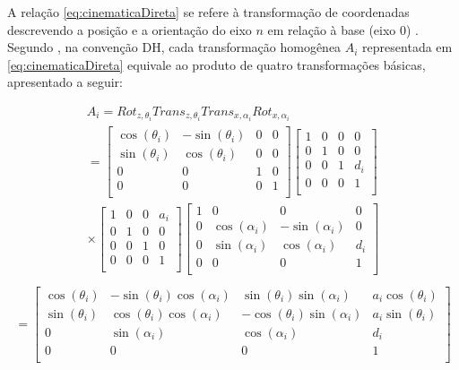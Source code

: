 A relação \eqref{eq:cinematicaDireta} se refere à transformação de coordenadas descrevendo 
a posição e a orientação do eixo $n$ em relação à base (eixo $0$) \cite{siciliano}. Segundo
, na convenção DH, cada transformação homogênea $A_i$ representada em
\eqref{eq:cinematicaDireta} equivale ao produto de quatro transformações básicas, apresentado a seguir:

\begin{equation*}
  \begin{gathered}
    A_i = Rot_{z,\theta_i}Trans_{z,\theta_i}Trans_{x,\alpha_i}Rot_{x,\alpha_i} \\[0.5cm]
    =\begin{bmatrix}
     \cos(\theta_i) & -\sin(\theta_i) & 0 & 0 \\
     \sin(\theta_i) & \cos(\theta_i) & 0 & 0 \\
     0 & 0 & 1 & 0 \\
     0 & 0 & 0 & 1 \\
    \end{bmatrix}
    \begin{bmatrix}
     1 & 0 & 0 & 0 \\
     0 & 1 & 0 & 0 \\
     0 & 0 & 1 & d_i \\
     0 & 0 & 0 & 1 \\
    \end{bmatrix} \\
    \times \begin{bmatrix}
     1 & 0 & 0 & a_i \\
     0 & 1 & 0 & 0 \\
     0 & 0 & 1 & 0 \\
     0 & 0 & 0 & 1 \\
    \end{bmatrix}
    \begin{bmatrix}
     1 & 0 & 0 & 0 \\
     0 & \cos(\alpha_i) & -\sin(\alpha_i) & 0 \\
     0 & \sin(\alpha_i) & \cos(\alpha_i) & d_i \\
     0 & 0 & 0 & 1 \\
    \end{bmatrix} \\
  \end{gathered}
\end{equation*}
\begin{equation}
  \begin{gathered}
    =
    \begin{bmatrix}
     \cos(\theta_i) & -\sin(\theta_i)\cos(\alpha_i) & \sin(\theta_i)\sin(\alpha_i) & a_i\cos(\theta_i) \\
     \sin(\theta_i) & \cos(\theta_i)\cos(\alpha_i) & -\cos(\theta_i)\sin(\alpha_i) & a_i\sin(\theta_i) \\
     0 & \sin(\alpha_i) & \cos(\alpha_i) & d_i \\
     0 & 0 & 0 & 1 \\
    \end{bmatrix}
  \end{gathered}
  \label{eq:matTransHomog}
\end{equation}

